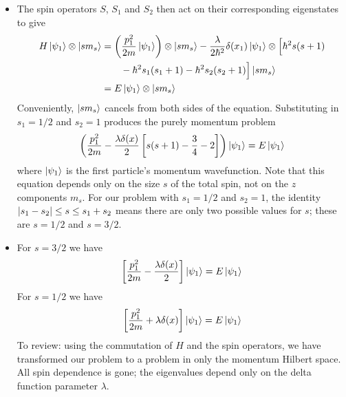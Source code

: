 \documentclass[11pt, a4paper]{article}
\begin{document}
\begin{itemize}
	\item The spin operators $ S $, $ S_{1} $ and $ S_{2} $ then act on their corresponding eigenstates to give
	\begin{align*}
		H \ket{\psi_{1}} \otimes \ket{sm_{s}} &= \left(\frac{p_{1}^{2}}{2m}\ket{\psi_{1}}\right)\otimes \ket{sm_{s}} - \frac{\lambda}{2\hbar^{2}} \delta (x_{1})\ket{\psi_{1}}\otimes \Big[\hbar^{2}s(s+1) \\
		&{} \qquad  - \hbar^{2}s_{1}(s_{1} + 1) - \hbar^{2}s_{2}(s_{2} + 1)\Big] \ket{sm_{s}} \\
		&= E \ket{\psi_{1}}\otimes \ket{sm_{s}}
	\end{align*}
	Conveniently, $ \ket{sm_{s}} $ cancels from both sides of the equation. Substituting in $ s_{1} = 1/2 $ and $ s_{2} = 1 $ produces the purely momentum problem
	\begin{equation*}
		\left(\frac{p_{1}^{2}}{2m} - \frac{\lambda \delta(x)}{2}\left[s(s+1) - \frac{3}{4} - 2\right]\right)\ket{\psi_{1}} = E \ket{\psi_{1}}
	\end{equation*}
	where $ \ket{\psi_{1}} $ is the first particle's momentum wavefunction. Note that this equation depends only on the size $ s $ of the total spin, not on the $ z $ components $ m_{s} $. For our problem with $ s_{1} = 1/2 $ and $ s_{2} = 1 $, the identity $ \abs{s_{1} - s_{2}} \leq s \leq s_{1} + s_{2} $ means there are only two possible values for $ s $; these are $ s = 1/2 $ and $ s = 3/2 $. 
	
	\item For $ s = 3/2 $ we have
	\begin{equation*}
		\left[\frac{p_{1}^{2}}{2m} - \frac{\lambda \delta(x)}{2}\right]\ket{\psi_{1}} = E \ket{\psi_{1}}
	\end{equation*}
	For $ s = 1/2 $ we have
	\begin{equation*}
		\left[\frac{p_{1}^{2}}{2m} + \lambda \delta(x)\right]\ket{\psi_{1}} = E \ket{\psi_{1}}
	\end{equation*}
	To review: using the commutation of $ H $ and the spin operators, we have transformed our problem to a problem in only the momentum Hilbert space. All spin dependence is gone; the eigenvalues depend only on the delta function parameter $ \lambda $. 	
\end{itemize}
\end{document}
